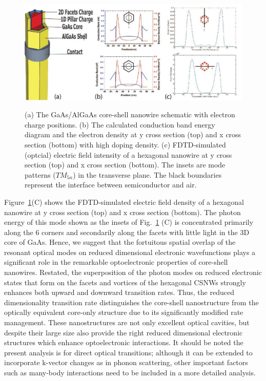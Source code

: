 \begin{figure}
  \caption{(a) The GaAs/AlGaAs core-shell nanowire schematic with electron charge positions. (b) The calculated conduction band energy diagram and the electron density at y cross section (top) and x cross section (bottom) with high doping density. (c) FDTD-simulated (optcial) electric field intensity of a hexagonal nanowire at y cross section (top) and x cross section (bottom). The insets are mode patterns ($TM_{5n}$) in the transverse plane. The black boundaries represent the interface between semiconductor and air.}
  \centering
  \includegraphics[width=\textwidth]{pictures/ED/Photoncharge}
  \label{PhotonCharge}
\end{figure}

Figure~\ref{PhotonCharge}(C) shows the FDTD-simulated electric field density
of a hexagonal nanowire at y cross section (top) and x cross section (bottom).
The photon energy of this mode shown as the insets of Fig.~\ref{PhotonCharge}
(C) is concentrated primarily along the 6 corners and secondarily along the
facets with little light in the 3D core of GaAs. Hence, we suggest that the
fortuitous spatial overlap of the resonant optical modes on reduced dimensional
electronic wavefunctions plays a significant role in the remarkable
optoelectronic properties of core-shell nanowires. Restated, the superposition
of the photon modes on reduced electronic states that form on the facets and
vortices of the hexagonal CSNWs strongly enhances both upward and downward
transition rates. Thus, the reduced dimensionality transition rate
distinguishes the core-shell nanostructure from the optically equivalent
core-only structure due to its significantly modified rate management. These
nanostructures are not only excellent optical cavities, but despite their large
size also provide the right reduced dimensional electronic structures which
enhance optoelectronic interactions. It should be noted the present analysis
is for direct optical transitions; although it can be extended to incorporate
k-vector changes as in phonon scattering, other important factors such as
many-body interactions need to be included in a more detailed analysis.

